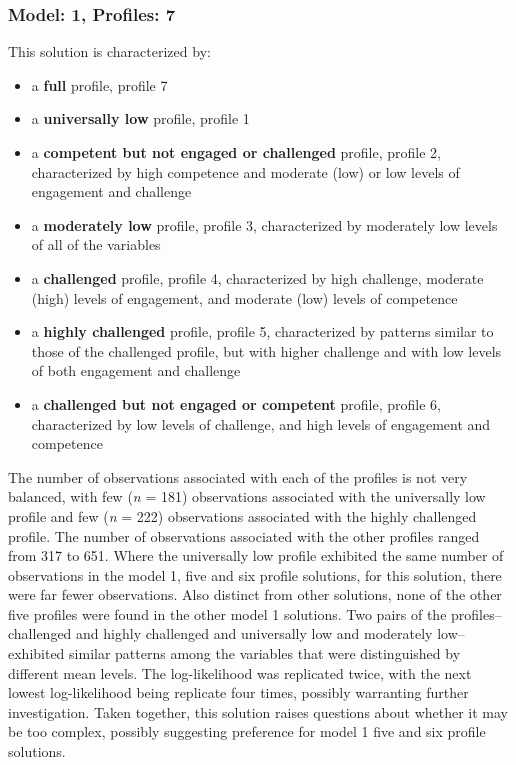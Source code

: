\documentclass[]{book}
\providecommand{\tightlist}{%
  \setlength{\itemsep}{0pt}\setlength{\parskip}{0pt}}
\theoremstyle{definition}
\theoremstyle{definition}
\theoremstyle{definition}
\theoremstyle{remark}
\begin{document}
\subsubsection{Model: 1, Profiles: 7}\label{model-1-profiles-7}

This solution is characterized by:

\begin{itemize}
\tightlist
\item
  a \textbf{full} profile, profile 7
\item
  a \textbf{universally low} profile, profile 1
\item
  a \textbf{competent but not engaged or challenged} profile, profile 2,
  characterized by high competence and moderate (low) or low levels of
  engagement and challenge
\item
  a \textbf{moderately low} profile, profile 3, characterized by
  moderately low levels of all of the variables
\item
  a \textbf{challenged} profile, profile 4, characterized by high
  challenge, moderate (high) levels of engagement, and moderate (low)
  levels of competence
\item
  a \textbf{highly challenged} profile, profile 5, characterized by
  patterns similar to those of the challenged profile, but with higher
  challenge and with low levels of both engagement and challenge
\item
  a \textbf{challenged but not engaged or competent} profile, profile 6,
  characterized by low levels of challenge, and high levels of
  engagement and competence
\end{itemize}

The number of observations associated with each of the profiles is not
very balanced, with few (\emph{n} = 181) observations associated with
the universally low profile and few (\emph{n} = 222) observations
associated with the highly challenged profile. The number of
observations associated with the other profiles ranged from 317 to 651.
Where the universally low profile exhibited the same number of
observations in the model 1, five and six profile solutions, for this
solution, there were far fewer observations. Also distinct from other
solutions, none of the other five profiles were found in the other model
1 solutions. Two pairs of the profiles--challenged and highly challenged
and universally low and moderately low--exhibited similar patterns among
the variables that were distinguished by different mean levels. The
log-likelihood was replicated twice, with the next lowest log-likelihood
being replicate four times, possibly warranting further investigation.
Taken together, this solution raises questions about whether it may be
too complex, possibly suggesting preference for model 1 five and six
profile solutions.
\end{document}
